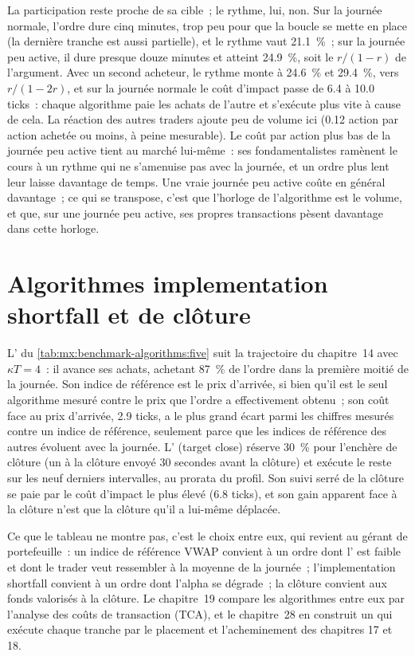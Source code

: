 La participation reste proche de sa cible~; le rythme, lui, non. Sur la journée normale, l'ordre dure cinq minutes, trop peu pour que la boucle se mette en place (la
dernière tranche est aussi partielle), et le rythme vaut 21.1~\%~; sur la journée peu active, il dure presque douze minutes et atteint 24.9~\%, soit le $r/(1-r)$ de l'argument. Avec un
second acheteur, le rythme monte à 24.6~\% et 29.4~\%, vers $r/(1-2r)$, et sur la journée normale le coût d'impact passe de 6.4 à 10.0 ticks~: chaque algorithme paie les achats de l'autre et
s'exécute plus vite à cause de cela. La réaction des autres traders ajoute peu de volume ici (0.12 action par action achetée ou moins,
à peine mesurable). Le coût par action plus bas de la journée peu active tient au marché lui-même~: ses fondamentalistes ramènent le cours à un rythme qui ne
s'amenuise pas avec la journée, et un ordre plus lent leur laisse davantage de temps. Une vraie journée peu active coûte en général davantage~; ce qui se transpose, c'est que l'horloge de l'algorithme est
le volume, et que, sur une journée peu active, ses propres transactions pèsent davantage dans cette horloge.

\section{Algorithmes implementation shortfall et de clôture}

L' du \cref{tab:mx:benchmark-algorithms:five} suit la trajectoire du chapitre~14 avec $\kappa T=4$~: il avance ses achats,
achetant 87~\% de l'ordre dans la première moitié de la journée. Son indice de référence est le prix d'arrivée, si bien qu'il est le seul algorithme mesuré contre le prix
que l'ordre a effectivement obtenu~; son coût face au prix d'arrivée, 2.9 ticks, a le plus grand écart parmi les chiffres mesurés contre un indice de référence, seulement parce que les
indices de référence des autres évoluent avec la journée. L' (target close) réserve 30~\% pour l'enchère de clôture (un  à la clôture envoyé 30 secondes avant la
clôture) et exécute le reste sur les neuf derniers intervalles, au prorata du profil. Son suivi serré de la clôture se paie par le coût d'impact le plus élevé
(6.8 ticks), et son gain apparent face à la clôture n'est que la clôture qu'il a lui-même déplacée.

Ce que le tableau ne montre pas, c'est le choix entre eux, qui revient au gérant de portefeuille~: un indice de référence VWAP convient à un ordre dont l' est
faible et dont le trader veut ressembler à la moyenne de la journée~; l'implementation shortfall convient à un ordre dont l'alpha se dégrade~; la clôture convient aux fonds
valorisés à la clôture. Le chapitre~19 compare les algorithmes entre eux par l'analyse des coûts de transaction (TCA), et le chapitre~28 en construit un qui exécute chaque
tranche par le placement et l'acheminement des chapitres 17 et 18.

